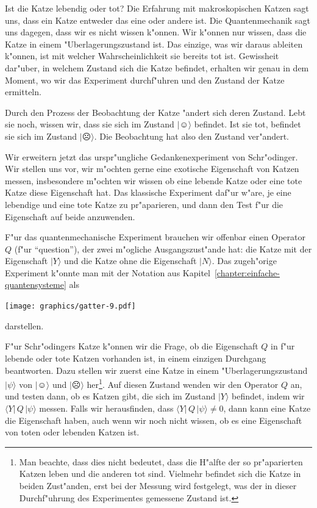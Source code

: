 Ist die Katze lebendig oder tot? Die Erfahrung mit makroskopischen
Katzen sagt uns, dass ein Katze entweder das eine oder andere ist.
Die Quantenmechanik sagt uns dagegen, dass wir es nicht wissen k"onnen.
Wir k"onnen nur wissen, dass die Katze in einem "Uberlagerungszustand
ist.
Das einzige, was wir daraus ableiten k"onnen, ist mit welcher
Wahrscheinlichkeit sie bereits tot ist.
Gewissheit dar"uber, in welchem Zustand sich die Katze befindet,
erhalten wir genau in dem Moment, wo wir das Experiment durchf"uhren
und den Zustand der Katze ermitteln.

Durch den Prozess der Beobachtung der Katze "andert sich deren Zustand.
Lebt sie noch, wissen wir, dass sie sich im Zustand $|\smiley\rangle$ befindet.
Ist sie tot, befindet sie sich im Zustand $|\frownie\rangle$.
Die Beobachtung hat also den Zustand ver"andert.

Wir erweitern jetzt das urspr"ungliche Gedankenexperiment von Schr"odinger.
Wir stellen uns vor, wir m"ochten gerne eine exotische Eigenschaft von
Katzen messen, insbesondere m"ochten wir wissen ob eine lebende Katze oder
eine tote Katze diese Eigenschaft hat. Das klassische Experiment
daf"ur w"are, je eine lebendige und eine tote Katze zu pr"aparieren,
und dann den Test f"ur die Eigenschaft auf beide anzuwenden.

F"ur das quantenmechanische Experiment brauchen wir offenbar einen
Operator $Q$ (f"ur ``question''), der zwei m"ogliche Ausgangszust"ande hat:
die Katze mit der
Eigenschaft $|Y\rangle$ und die Katze ohne die Eigenschaft $|N\rangle$.
Das zugeh"orige Experiment k"onnte man mit der Notation aus
Kapitel~\ref{chapter:einfache-quantensysteme} als
\begin{center}
\texttt{[image: graphics/gatter-9.pdf]}
\end{center}
darstellen. 

F"ur Schr"odingers Katze k"onnen wir die Frage, ob die Eigenschaft $Q$
in f"ur lebende oder tote Katzen vorhanden ist, in einem einzigen
Durchgang beantworten.
Dazu stellen wir zuerst eine Katze in einem "Uberlagerungszustand
$|\psi\rangle$ von $|\smiley\rangle$ und $|\frownie\rangle$ her\footnote{
Man beachte, dass dies nicht bedeutet, dass die H"alfte der so pr"aparierten
Katzen leben und die anderen tot sind.
Vielmehr befindet sich die Katze in beiden Zust"anden, erst bei der
Messung wird festgelegt, was der in dieser Durchf"uhrung des Experimentes
gemessene Zustand ist.
}.
Auf diesen Zustand wenden wir den Operator $Q$ an, und testen dann,
ob es Katzen gibt, die sich im Zustand $|Y\rangle$ befindet, indem
wir $\langle Y|\,Q\,|\psi\rangle$ messen.
Falls wir herausfinden, dass $\langle Y|\,Q\,|\psi\rangle\ne 0$,
dann kann eine Katze die Eigenschaft haben, auch wenn wir noch nicht
wissen, ob es eine Eigenschaft von toten oder lebenden Katzen ist.

